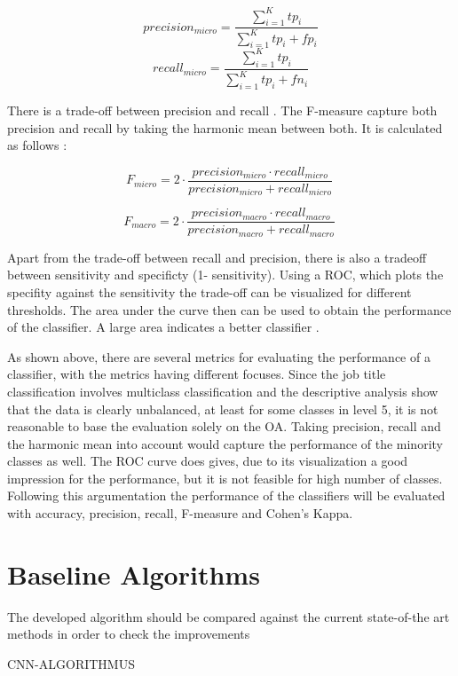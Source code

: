 \documentclass[12pt, a4paper, titlepage]{article}
\begin{document}
\[precision_{micro} = \frac{\sum_{i=1}^K tp_i}{\sum_{i=1}^K tp_i + fp_i}\]
\[recall_{micro} = \frac{\sum_{i=1}^K tp_i}{\sum_{i=1}^K tp_i + fn_i}\]

There is a trade-off between precision and recall \citep{Buckland1994}. The F-measure capture both precision and recall by taking the harmonic mean between both. It is calculated as follows \citep{Branco2017,Pan2016}:  

\[F_{micro} = 2 \cdot \frac{precision_{micro} \cdot recall_{micro} }{precision_{micro} + recall_{micro} }\ \]

\[F_{macro} = 2 \cdot \frac{precision_{macro} \cdot recall_{macro} }{precision_{macro} + recall_{macro} }\ \]

Apart from the trade-off between recall and precision, there is also a tradeoff between sensitivity and specificty (1- sensitivity). Using a \ac{ROC}, which plots the specifity against the sensitivity the trade-off can be visualized for different thresholds. The area under the curve then can be used to obtain the performance of the classifier. A large area indicates a better classifier \citep{Berthold2020, Espindola2005}. 

As shown above, there are several metrics for evaluating the performance of a classifier, with the metrics having different focuses. Since the job title classification involves multiclass classification and the descriptive analysis show that the data is clearly unbalanced, at least for some classes in level 5, it is not reasonable to base the evaluation solely on the \ac{OA}. Taking precision, recall and the harmonic mean into account would capture the performance of the minority classes as well. The \ac{ROC} curve does gives, due to its visualization a good impression for the performance, but it is not feasible for high number of classes. Following this argumentation the performance of the classifiers will be evaluated with accuracy, precision, recall, F-measure and Cohen's Kappa. 

\section{Baseline Algorithms}
The developed algorithm should be compared against the current state-of-the art methods in order to check the improvements 

CNN-ALGORITHMUS 
\end{document}
